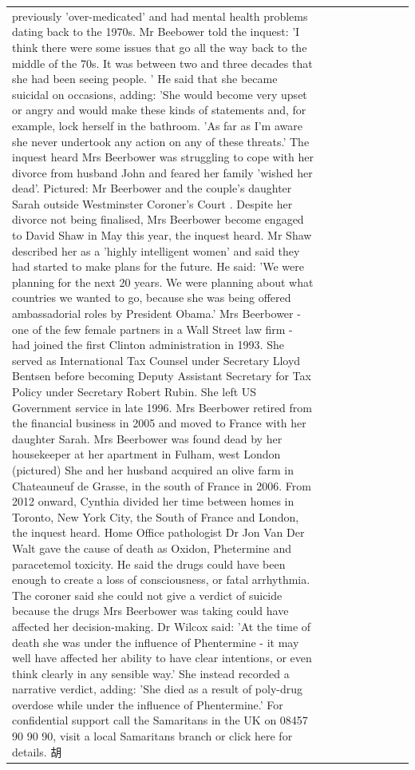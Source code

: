 \begin{table}[H]
\begin{tabular}{lllrlllll}
previously 'over-medicated' and had mental health problems dating back to the 1970s. Mr Beebower told the inquest: 'I think there were some issues that go all the way back to the middle of the 70s. It was between two and three decades that she had been seeing people. ' He said that she became suicidal on occasions, adding: 'She would become very upset or angry and would make these kinds of statements and, for example, lock herself in the bathroom. 'As far as I'm aware she never undertook any action on any of these threats.' The inquest heard Mrs Beerbower was struggling to cope with her divorce from husband John and feared her family 'wished her dead'. Pictured: Mr Beerbower and the couple's daughter Sarah outside Westminster Coroner's Court . Despite her divorce not being finalised, Mrs Beerbower become engaged to David Shaw in May this year, the inquest heard. Mr Shaw described her as a 'highly intelligent women' and said they had started to make plans for the future. He said: 'We were planning for the next 20 years. We were planning about what countries we wanted to go, because she was being offered ambassadorial roles by President Obama.' Mrs Beerbower - one of the few female partners in a Wall Street law firm - had joined the first Clinton administration in 1993. She served as International Tax Counsel under Secretary Lloyd Bentsen before becoming Deputy Assistant Secretary for Tax Policy under Secretary Robert Rubin. She left US Government service in late 1996. Mrs Beerbower retired from the financial business in 2005 and moved to France with her daughter Sarah. Mrs Beerbower was found dead by her housekeeper at her apartment in Fulham, west London (pictured) She and her husband acquired an olive farm in Chateauneuf de Grasse, in the south of France in 2006. From 2012 onward, Cynthia divided her time between homes in Toronto, New York City, the South of France and London, the inquest heard. Home Office pathologist Dr Jon Van Der Walt gave the cause of death as Oxidon, Phetermine and paracetemol toxicity. He said the drugs could have been enough to create a loss of consciousness, or fatal arrhythmia. The coroner said she could not give a verdict of suicide because the drugs Mrs Beerbower was taking could have affected her decision-making. Dr Wilcox said: 'At the time of death she was under the influence of Phentermine - it may well have affected her ability to have clear intentions, or even think clearly in any sensible way.' She instead recorded a narrative verdict, adding: 'She died as a result of poly-drug overdose while under the influence of Phentermine.' For confidential support call the Samaritans in the UK on 08457 90 90 90, visit a local Samaritans branch or click here for details. 胡 \\

\end{tabular}
\end{table}

